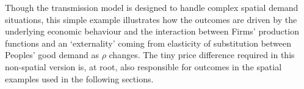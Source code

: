 Though the transmission model is designed to handle complex spatial demand situations, this simple example illustrates how the outcomes are driven by the underlying economic behaviour and the interaction between Firms' production functions and an `externality' coming from elasticity of substitution between Peoples' good demand as $\rho$ changes. The tiny price difference required in this non-spatial version is, at root, also responsible for outcomes in the spatial examples used in the following sections. 

